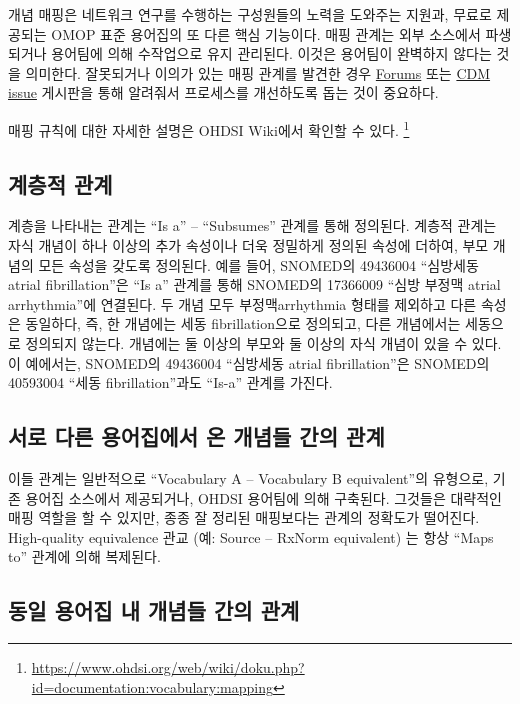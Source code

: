 \documentclass[11pt]{book}
\let\rmarkdownfootnote\footnote%
\def\footnote{\protect\rmarkdownfootnote}
\theoremstyle{definition}
\theoremstyle{definition}
\theoremstyle{definition}
\theoremstyle{remark}
\begin{document}
개념 매핑은 네트워크 연구를 수행하는 구성원들의 노력을 도와주는 지원과,
무료로 제공되는 OMOP 표준 용어집의 또 다른 핵심 기능이다. 매핑 관계는
외부 소스에서 파생되거나 용어팀에 의해 수작업으로 유지 관리된다. 이것은
용어팀이 완벽하지 않다는 것을 의미한다. 잘못되거나 이의가 있는 매핑
관계를 발견한 경우 \href{https://forums.ohdsi.org}{Forums} 또는
\href{https://github.com/OHDSI/CommonDataModel/issues}{CDM issue}
게시판을 통해 알려줘서 프로세스를 개선하도록 돕는 것이 중요하다.

매핑 규칙에 대한 자세한 설명은 OHDSI Wiki에서 확인할 수 있다. \footnote{\url{https://www.ohdsi.org/web/wiki/doku.php?id=documentation:vocabulary:mapping}}

\subsection{계층적 관계}\label{-}

계층을 나타내는 관계는 ``Is a'' -- ``Subsumes'' 관계를 통해 정의된다.
계층적 관계는 자식 개념이 하나 이상의 추가 속성이나 더욱 정밀하게 정의된
속성에 더하여, 부모 개념의 모든 속성을 갖도록 정의된다. 예를 들어,
SNOMED의 49436004 ``심방세동 atrial fibrillation''은 ``Is a'' 관계를
통해 SNOMED의 17366009 ``심방 부정맥 atrial arrhythmia''에 연결된다. 두
개념 모두 부정맥arrhythmia 형태를 제외하고 다른 속성은 동일하다, 즉, 한
개념에는 세동 fibrillation으로 정의되고, 다른 개념에서는 세동으로
정의되지 않는다. 개념에는 둘 이상의 부모와 둘 이상의 자식 개념이 있을 수
있다. 이 예에서는, SNOMED의 49436004 ``심방세동 atrial fibrillation''은
SNOMED의 40593004 ``세동 fibrillation''과도 ``Is-a'' 관계를 가진다.

\subsection{서로 다른 용어집에서 온 개념들 간의 관계}\label{------}

이들 관계는 일반적으로 ``Vocabulary A -- Vocabulary B equivalent''의
유형으로, 기존 용어집 소스에서 제공되거나, OHDSI 용어팀에 의해 구축된다.
그것들은 대략적인 매핑 역할을 할 수 있지만, 종종 잘 정리된 매핑보다는
관계의 정확도가 떨어진다. High-quality equivalence 관교 (예: Source --
RxNorm equivalent) 는 항상 ``Maps to'' 관계에 의해 복제된다.

\subsection{동일 용어집 내 개념들 간의 관계}\label{-----}
\end{document}
